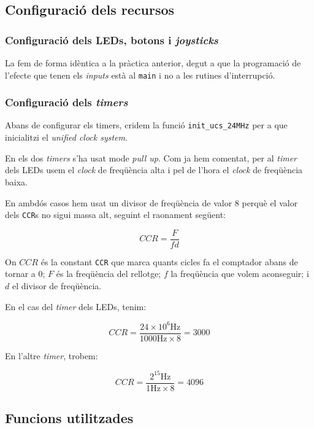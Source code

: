 \documentclass{../pdae} %
\begin{document}
\subsection{Configuració dels recursos}
\subsubsection{Configuració dels LEDs, botons i \textit{joysticks}}

La fem de forma idèntica a la pràctica anterior, degut a que la programació
de l'efecte que tenen els \textit{inputs} està al \texttt{main} i no
a les rutines d'interrupció.

\subsubsection{Configuració dels \textit{timers}}
Abans de configurar els timers, cridem la funció \texttt{init\_ucs\_24MHz} per
a que inicialitzi el \textit{unified clock system}.

En els dos \textit{timers} s'ha usat mode \textit{pull up}. Com ja hem comentat,
per al \textit{timer} dels LEDs usem el \textit{clock} de freqüència alta i
pel de l'hora el \textit{clock} de freqüència baixa.

En ambdós casos hem usat un divisor de freqüència de valor 8 perquè el valor
dels \texttt{CCR}s no sigui massa alt, seguint el raonament següent:

\begin{equation*}
  CCR = \frac{F}{fd}
\end{equation*}

On $CCR$ és la constant \texttt{CCR} que marca quants cicles fa el comptador
abans de tornar a 0; $F$ és la freqüència del rellotge; $f$ la freqüència que
volem aconseguir; i $d$ el divisor de freqüència.

En el cas del \textit{timer} dels LEDs, tenim:

\begin{equation*}
  CCR = \frac{24\times10^{6}\mathrm{Hz}}{1000\mathrm{Hz}\times 8} = 3000
\end{equation*}

En l'altre \textit{timer}, trobem:

\begin{equation*}
  CCR = \frac{2^{15}\mathrm{Hz}}{1\mathrm{Hz}\times 8} = 4096
\end{equation*}


\subsection{Funcions utilitzades}
\end{document}
